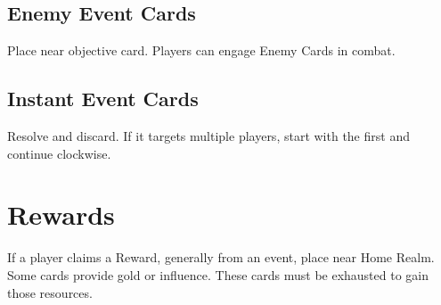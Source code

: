 \documentclass[12pt]{article}
\begin{document}
\begin{multicols*}{2}
\subsection*{Enemy Event Cards}
Place near objective card. Players can engage Enemy Cards in combat.

\subsection*{Instant Event Cards}
Resolve and discard. If it targets multiple players, start with the first and continue clockwise.

\section*{Rewards}
If a player claims a Reward, generally from an event, place near Home Realm. Some cards provide gold or influence. These cards must be exhausted to gain those resources.


\end{multicols*}
\end{document}
